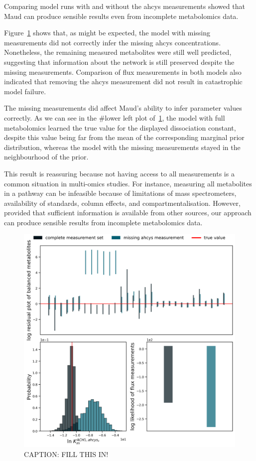 \documentclass[journal=,manuscript=]{achemso}
\begin{document}
Comparing model runs with and without the ahcys measurements showed that
Maud can produce sensible results even from incomplete metabolomics
data.

Figure~\ref{fig-missing} shows that, as might be expected, the model
with missing measurements did not correctly infer the missing ahcys
concentrations. Nonetheless, the remaining measured metabolites were
still well predicted, suggesting that information about the network is
still preserved despite the missing measurements. Comparison of flux
measurements in both models also indicated that removing the ahcys
measurement did not result in catastrophic model failure.

The missing measurements did affect Maud's ability to infer parameter
values correctly. As we can see in the \#lower left plot
of~\ref{fig-missing}, the model with full metabolomics learned the true
value for the displayed dissociation constant, despite this value being
far from the mean of the corresponding marginal prior distribution,
whereas the model with the missing measurements stayed in the
neighbourhood of the prior.

This result is reassuring because not having access to all measurements
is a common situation in multi-omics studies. For instance, measuring
all metabolites in a pathway can be infeasible because of limitations of
mass spectrometers, availability of standards, column effects, and
compartmentalisation. However, provided that sufficient information is
available from other sources, our approach can produce sensible results
from incomplete metabolomics data.

\begin{figure}

{\centering \includegraphics{./figures/missing.png}

}

\caption{\label{fig-missing}CAPTION: FILL THIS IN!}

\end{figure}
\end{document}
